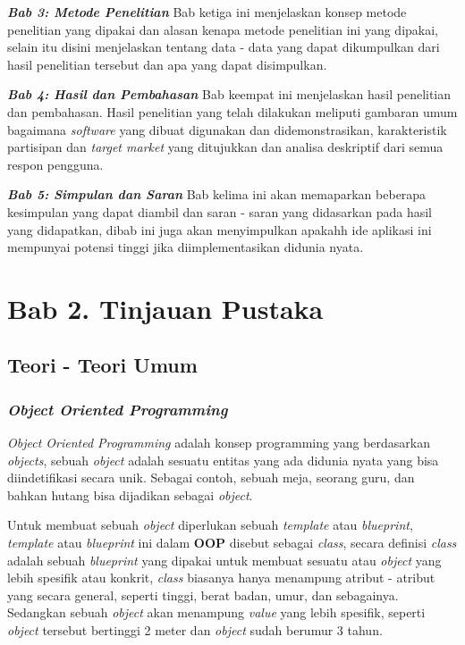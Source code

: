 \documentclass[a4paper]{article}
\newcommand{\bab}[1]{%
    \addtocounter{section}{1}%
    \setcounter{subsection}{0}
    \setcounter{subsubsection}{0}
    \setcounter{figure}{0}
    \setcounter{table}{0}
    \section*{#1}%
    \addcontentsline{toc}{section}{\protect\numberline{}#1}%
}
\newcommand{\subbab}[1]{%
    \subsection{#1}%
    \setcounter{figure}{0}
    \setcounter{table}{0}
}
\newcommand{\subsubbab}[1]{%
    \subsubsection{#1}%
}
\begin{document}
\textit{\textbf{Bab 3: Metode Penelitian}}\newline
Bab ketiga ini menjelaskan konsep metode penelitian yang dipakai dan alasan kenapa metode penelitian ini yang dipakai, selain itu disini menjelaskan tentang data - data yang dapat dikumpulkan dari hasil penelitian tersebut dan apa yang dapat disimpulkan.

\textit{\textbf{Bab 4: Hasil dan Pembahasan}}\newline
Bab keempat ini menjelaskan hasil penelitian dan pembahasan. Hasil penelitian yang telah dilakukan meliputi gambaran umum bagaimana \textit{software} yang dibuat digunakan dan didemonstrasikan, karakteristik partisipan dan \textit{target market} yang ditujukkan dan analisa deskriptif dari semua respon pengguna.

\textit{\textbf{Bab 5: Simpulan dan Saran}}\newline
Bab kelima ini akan memaparkan beberapa kesimpulan yang dapat diambil dan saran - saran yang didasarkan pada hasil yang didapatkan, dibab ini juga akan menyimpulkan apakahh ide aplikasi ini mempunyai potensi tinggi jika diimplementasikan didunia nyata.

\newpage
{}
\newpage
\bab{Bab 2. Tinjauan Pustaka}
\subbab{Teori - Teori Umum}

\subsubbab{\textit{Object Oriented Programming}}
\textit{Object Oriented Programming} adalah konsep programming yang berdasarkan \textit{objects}, sebuah \textit{object} adalah sesuatu entitas yang ada didunia nyata yang bisa diindetifikasi secara unik\autocite{liang_liang_2021}. Sebagai contoh, sebuah meja, seorang guru, dan bahkan hutang bisa dijadikan sebagai \textit{object}.

Untuk membuat sebuah \textit{object} diperlukan sebuah \textit{template} atau \textit{blueprint}, \textit{template} atau \textit{blueprint} ini dalam \textbf{OOP} disebut sebagai \textit{class}, secara definisi \textit{class} adalah sebuah \textit{blueprint} yang dipakai untuk membuat sesuatu atau \textit{object} yang lebih spesifik atau konkrit\autocite{education-erin-oop-2020}, \textit{class} biasanya hanya menampung atribut - atribut yang secara general, seperti tinggi, berat badan, umur, dan sebagainya. Sedangkan sebuah \textit{object} akan menampung \textit{value} yang lebih spesifik, seperti \textit{object} tersebut bertinggi 2 meter dan \textit{object} sudah berumur 3 tahun.
\end{document}
